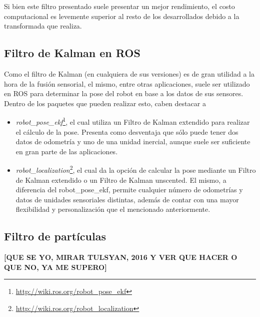 Si bien este filtro presentado suele presentar un mejor rendimiento, el costo computacional es levemente superior al resto de los desarrollados debido a la transformada que realiza.

\subsection{Filtro de Kalman en ROS}
Como el filtro de Kalman (en cualquiera de sus versiones) es de gran utilidad a la hora de la fusión sensorial, el mismo, entre otras aplicaciones, suele ser utilizado en ROS para determinar la pose del robot en base a los datos de sus sensores. Dentro de los paquetes que pueden realizar esto, caben destacar a
\begin{itemize}
    \item \textit{robot\_pose\_ekf}\footnote{\url{http://wiki.ros.org/robot_pose_ekf}}, el cual utiliza un Filtro de Kalman extendido para realizar el cálculo de la pose. Presenta como desventaja que sólo puede tener dos datos de odometría y uno de una unidad inercial, aunque suele ser suficiente en gran parte de las aplicaciones.
    \item \textit{robot\_localization}\footnote{\url{http://wiki.ros.org/robot_localization}}, el cual da la opción de calcular la pose mediante un Filtro de Kalman extendido o un Filtro de Kalman unscented. El mismo, a diferencia del robot\_pose\_ekf, permite cualquier número de odometrías y datos de unidades sensoriales distintas, además de contar con una mayor flexibilidad y personalización que el mencionado anteriormente.
\end{itemize}

\subsection{Filtro de partículas}
\textbf{[QUE SE YO, MIRAR TULSYAN, 2016 Y VER QUE HACER O QUE NO, YA ME SUPERO]}

